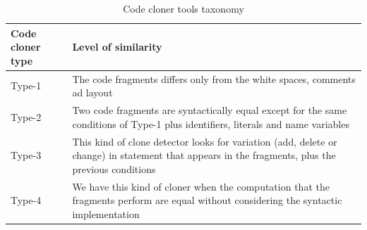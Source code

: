 \begin{table}[!h]
	\begin{tabular}{|p{3.2cm}|p{10cm}|}\hline
		\textbf{Code cloner type} & \textbf{Level of similarity}  \\	\hline
		Type-1 & The code fragments differs only from the white spaces, comments ad layout \\\hline
		Type-2 &  Two code fragments are syntactically equal except for the same conditions of Type-1 plus identifiers, literals and name variables\\\hline
		Type-3 &  This kind of clone detector looks for variation (add, delete or change) in statement that appears in the fragments, plus the previous conditions \\\hline
		Type-4 &  We have this kind of cloner when the computation that the fragments perform are equal without considering the syntactic implementation \\\hline		
	\end{tabular}		
	\caption{ Code cloner tools taxonomy}
	\label{tab:CodeCloningTaxonomy}
\end{table} 




